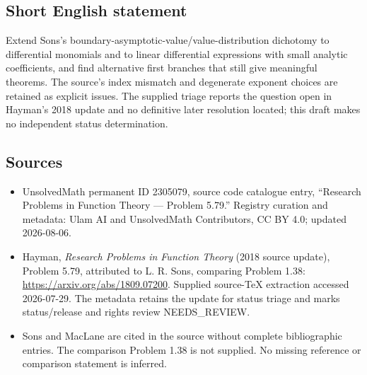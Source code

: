 \documentclass[11pt]{article}
\begin{document}
\subsection{Short English statement}
Extend Sons's boundary-asymptotic-value/value-distribution dichotomy to differential monomials and to linear differential expressions with small analytic coefficients, and find alternative first branches that still give meaningful theorems. The source's index mismatch and degenerate exponent choices are retained as explicit issues. The supplied triage reports the question open in Hayman's 2018 update and no definitive later resolution located; this draft makes no independent status determination.
\subsection{Sources}
\begin{itemize}
\item UnsolvedMath permanent ID 2305079, source code catalogue entry, ``Research Problems in Function Theory --- Problem 5.79.'' Registry curation and metadata: Ulam AI and UnsolvedMath Contributors, CC BY 4.0; updated 2026-08-06.
\item Hayman, \emph{Research Problems in Function Theory} (2018 source update), Problem 5.79, attributed to L. R. Sons, comparing Problem 1.38: \url{https://arxiv.org/abs/1809.07200}. Supplied source-TeX extraction accessed 2026-07-29. The metadata retains the update for status triage and marks status/release and rights review NEEDS\_REVIEW.
\item Sons and MacLane are cited in the source without complete bibliographic entries. The comparison Problem 1.38 is not supplied. No missing reference or comparison statement is inferred.
\end{itemize}
\end{document}
